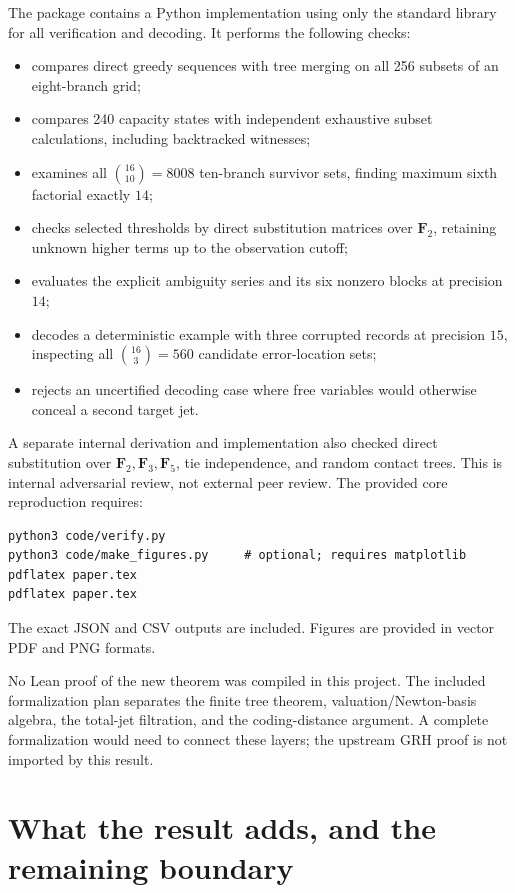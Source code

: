 \documentclass[11pt]{article}
\theoremstyle{definition}
\newcommand{\F}{\mathbf F}
\begin{document}
The package contains a Python implementation using only the standard library for all verification and decoding. It performs the following checks:
\begin{itemize}
\item compares direct greedy sequences with tree merging on all 256 subsets of an eight-branch grid;
\item compares 240 capacity states with independent exhaustive subset calculations, including backtracked witnesses;
\item examines all $\binom{16}{10}=8008$ ten-branch survivor sets, finding maximum sixth factorial exactly $14$;
\item checks selected thresholds by direct substitution matrices over $\F_2$, retaining unknown higher terms up to the observation cutoff;
\item evaluates the explicit ambiguity series and its six nonzero blocks at precision $14$;
\item decodes a deterministic example with three corrupted records at precision $15$, inspecting all $\binom{16}{3}=560$ candidate error-location sets;
\item rejects an uncertified decoding case where free variables would otherwise conceal a second target jet.
\end{itemize}

A separate internal derivation and implementation also checked direct substitution over $\F_2,\F_3,\F_5$, tie independence, and random contact trees. This is internal adversarial review, not external peer review. The provided core reproduction requires:
\begin{verbatim}
python3 code/verify.py
python3 code/make_figures.py     # optional; requires matplotlib
pdflatex paper.tex
pdflatex paper.tex
\end{verbatim}
The exact JSON and CSV outputs are included. Figures are provided in vector PDF and PNG formats.

No Lean proof of the new theorem was compiled in this project. The included formalization plan separates the finite tree theorem, valuation/Newton-basis algebra, the total-jet filtration, and the coding-distance argument. A complete formalization would need to connect these layers; the upstream GRH proof is not imported by this result.

\section{What the result adds, and the remaining boundary}
\end{document}
